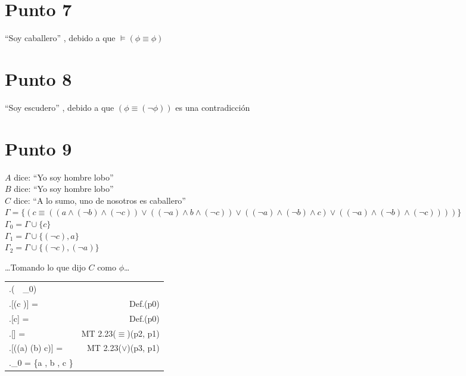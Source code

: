 \documentclass{article}
\newcommand{\q}[1]{``#1''}
\newcommand{\val}[2]{\mathbf{#1}[#2]}
\newlength{\logicv}
\newenvironment{logicenv}[2][0]{
  \begin{tcolorbox}[demo, title = #2]
  \vspace*{#1\logicv}
}{
  \end{tcolorbox}
  \vspace*{-.5cm}
}
\newenvironment{subproofill}[1][0]{
  \begin{tcolorbox}[demo, title = ]
    \vspace*{-#1\logicv}
}{
  \end{tcolorbox}
  \vspace*{-.5cm}
}
\newenvironment{subproof}[2][0]{
  \begin{tcolorbox}[demo, title = #2, colframe = black]
  \vspace*{#1\logicv}
  \begin{logic}
}{
  \end{logic}
  \end{tcolorbox}
}
\newenvironment{logic}{
    \setlength{\extrarowheight}{3pt}
    \setcounter{row}{-1}
    \begin{center}
    \begin{NiceTabular}{>{\stepcounter{row}\therow.\hspace*{5pt}} L r }
}{
    \end{NiceTabular}
    \end{center}
}
\begin{document}
\section{Punto 7}

\q{Soy caballero} , debido a que $\vDash (\phi \equiv \phi)$

\section{Punto 8}

\q{Soy escudero} , debido a que $(\phi \equiv (\neg \phi))$ es una contradicción

\section{Punto 9}

\begin{logicenv}[5]{Punto 9{, $A$, $B$, $C$}}
  $A$ dice: \q{Yo soy hombre lobo}\\
  $B$ dice: \q{Yo soy hombre lobo}\\
  $C$ dice: \q{A lo sumo, uno de nosotros es caballero}\\
  $\Gamma = \{(c \equiv ((a \land (\neg b) \land (\neg c)) \lor ((\neg a) \land b \land (\neg c)) \lor ((\neg a) \land (\neg b) \land c) \lor ((\neg a) \land (\neg b) \land (\neg c))))\}$\\
  $\Gamma_0 = \Gamma \cup \{c\}$\\
  $\Gamma_1 = \Gamma \cup \{(\neg c), a\}$\\
  $\Gamma_2 = \Gamma \cup \{(\neg c), (\neg a)\}$
\end{logicenv}

\begin{subproofill}
  \dots Tomando lo que dijo $C$ como $\phi$\dots
  \begin{subproof}{Con $\Gamma_0$}
    (\exists {}\, \vert\,   \Gamma_0)\\
    \val{v}{(c \equiv \phi)} =  & Def.(p0)\\
    \val{v}{c} =  & Def.(p0)\\
    \val{v}{\phi} =  & MT 2.23($\equiv$)(p2, p1)\\
    \val{v}{((\neg a) \land (\neg b) \land c)} =  & MT 2.23($\lor$)(p3, p1)\\
    _0 = \{a \mapsto {}, b \mapsto {}, c \mapsto {}\}
  \end{subproof}
\end{subproofill}
\end{document}
